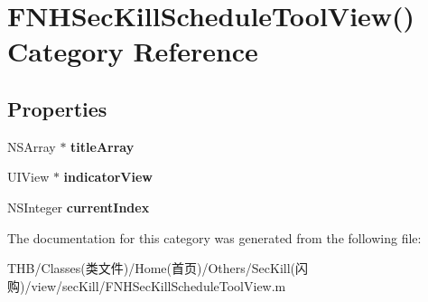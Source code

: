 \hypertarget{category_f_n_h_sec_kill_schedule_tool_view_07_08}{}\section{F\+N\+H\+Sec\+Kill\+Schedule\+Tool\+View() Category Reference}
\label{category_f_n_h_sec_kill_schedule_tool_view_07_08}
\subsection*{Properties}
\begin{DoxyCompactItemize}
\item 
\mbox{\label{category_f_n_h_sec_kill_schedule_tool_view_07_08_adf1ba9803d92fc964d19ae1750870114}} 
N\+S\+Array $\ast$ {\bfseries title\+Array}
\item 
\mbox{\label{category_f_n_h_sec_kill_schedule_tool_view_07_08_a2ba0d105ce384ef1467773a03a2eeb96}} 
U\+I\+View $\ast$ {\bfseries indicator\+View}
\item 
\mbox{\label{category_f_n_h_sec_kill_schedule_tool_view_07_08_a5461510b2b550d22362669badbe3634f}} 
N\+S\+Integer {\bfseries current\+Index}
\end{DoxyCompactItemize}


The documentation for this category was generated from the following file\+:\begin{DoxyCompactItemize}
\item 
T\+H\+B/\+Classes(类文件)/\+Home(首页)/\+Others/\+Sec\+Kill(闪购)/view/sec\+Kill/F\+N\+H\+Sec\+Kill\+Schedule\+Tool\+View.\+m\end{DoxyCompactItemize}
